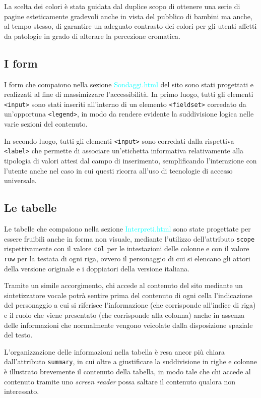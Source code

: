 \documentclass[10pt,a4paper,onecolumn]{article}
\newcommand{\sitepage}[1]{\textcolor{cyan}{\textsf{#1}}}
\newcommand{\inglese}[1]{\foreignlanguage{english}{\itshape{}#1}}
\begin{document}
La scelta dei colori è stata guidata dal duplice scopo di ottenere una serie di pagine esteticamente gradevoli anche in vista del pubblico di bambini ma anche, al tempo stesso, di garantire un adeguato contrasto dei colori per gli utenti affetti da patologie in grado di alterare la percezione cromatica.


\subsection{I form}
I form che compaiono nella sezione \sitepage{Sondaggi.html} del sito sono stati progettati e realizzati al fine di massimizzare l'accessibilità. In primo luogo, tutti gli elementi \texttt{<input>} sono stati inseriti all'interno di un elemento \texttt{<fieldset>} corredato da un'opportuna \texttt{<legend>}, in modo da rendere evidente la suddivisione logica nelle varie sezioni del contenuto.

In secondo luogo, tutti gli elementi \texttt{<input>} sono corredati dalla rispettiva \texttt{<label>} che permette di associare un'etichetta informativa relativamente alla tipologia di valori attesi dal campo di inserimento, semplificando l'interazione con l'utente anche nel caso in cui questi ricorra all'uso di tecnologie di accesso universale.


\subsection{Le tabelle}
Le tabelle che compaiono nella sezione \sitepage{Interpreti.html} sono state progettate per essere fruibili anche in forma non visuale, mediante l'utilizzo dell'attributo \texttt{scope} rispettivamente con il valore \texttt{col} per le intestazioni delle colonne e con il valore \texttt{row} per la testata di ogni riga, ovvero il personaggio di cui si elencano gli attori della versione originale e i doppiatori della versione italiana.

Tramite un simile accorgimento, chi accede al contenuto del sito mediante un sintetizzatore vocale potrà sentire prima del contenuto di ogni cella l'indicazione del personaggio a cui si riferisce l'informazione (che corrisponde all'indice di riga) e il ruolo che viene presentato (che corrisponde alla colonna) anche in assenza delle informazioni che normalmente vengono veicolate dalla disposizione spaziale del testo.

L'organizzazione delle informazioni nella tabella è resa ancor più chiara dall'attributo \texttt{summary}, in cui oltre a giustificare la suddivisione in righe e colonne è illustrato brevemente il contenuto della tabella, in modo tale che chi accede al contenuto tramite uno \inglese{screen reader} possa saltare il contenuto qualora non interessato.
\end{document}
